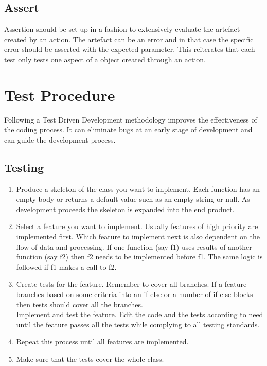 \documentclass[12pt]{article}
\begin{document}
\subsection{Assert}
Assertion should be set up in a fashion to extensively evaluate the artefact
created by an action. The artefact can be an error and in that case the
specific error should be asserted with the expected parameter. This
reiterates that each test only tests one aspect of a object created through
an action.

\section{Test Procedure}
Following a Test Driven Development methodology improves the effectiveness of the coding process. It can eliminate bugs at an early stage of development and can guide the development process.

\subsection{Testing}
\begin{enumerate}
	\item
	Produce a skeleton of the class you want to implement. Each function has an empty body or returns a default value such as an empty string or null. As development proceeds the skeleton is expanded into the end product.
	\item
	Select a feature you want to implement. Usually features of high priority are implemented first. Which feature to implement next is also dependent on the flow of data and processing. If one function (say f1) uses results of another function (say f2) then f2 needs to be implemented before f1. The same logic is followed if f1 makes a call to f2.
	\item
	Create tests for the feature. Remember to cover all branches. If a feature branches based on some criteria into an if-else or a number of if-else blocks then tests should cover all the branches.\\
	Implement and test the feature. Edit the code and the tests according to need until the feature passes all the tests while complying to all testing standards.
	\item
	Repeat this process until all features are implemented.
	\item
	Make sure that the tests cover the whole class.
\end{enumerate}
\end{document}
